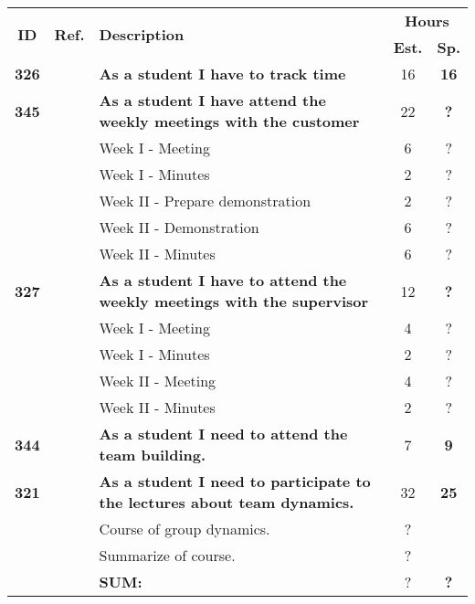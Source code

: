 \label{tab:sprint1storiesProcess}
\def\arraystretch{1.25}
 
\begin{longtable}{ccXcc}

\toprule[0.5mm]
\multirow{2}{*}{\textbf{ID}} &
\multirow{2}{*}{\textbf{Ref.}} & \multirow{2}{*}{\textbf{Description}} & \multicolumn{2}{c}{\textbf{Hours}} \\
 					& & & \textbf{Est.} & \textbf{Sp.} \\
\midrule

\textbf{326} 	&& {\bf  As a student I have to track time} 										& 	16	& \textbf{16} \\
	
\textbf{345} 	&& {\bf As a student I have attend the weekly meetings with the customer} 			& 	22	& \textbf{?} \\
		&& Week I - Meeting							&  6 & ? \\
		&& Week I - Minutes							&  2 & ? \\
		&& Week II - Prepare demonstration			&  2 & ? \\
		&& Week II - Demonstration					&  6 & ? \\
		&& Week II - Minutes						&  6 & ? \\


		
\textbf{327} 	&& {\bf As a student I have to attend the weekly meetings with the supervisor} 		& 	12	& \textbf{?} \\
		&& Week I - Meeting							&  4 & ? \\
		&& Week I - Minutes							&  2 & ? \\
		&& Week II - Meeting						&  4 & ? \\
		&& Week II - Minutes						&  2 & ? \\


\textbf{344} 	&& {\bf As a student I need to attend the team building.} 							& 		7	& \textbf{9} \\
		

\textbf{321} 	&& {\bf As a student I need to participate to the lectures about team dynamics. } 	& 		32	& \textbf{25} \\
		&& Course of group dynamics.				& ?  &  \\
		&& Summarize of course.						& ?  &  \\				
				
\hline
				&& \textbf{SUM:}		&		?	& \textbf{?}
 \\																			
\bottomrule[0.5mm]
\end{longtable}
